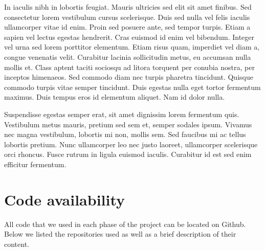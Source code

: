 \documentclass[
  12pt,
  a4paper,
  oneside]{krantz}
\begin{document}
In iaculis nibh in lobortis feugiat. Mauris ultricies sed elit sit amet
finibus. Sed consectetur lorem vestibulum cursus scelerisque. Duis sed
nulla vel felis iaculis ullamcorper vitae id enim. Proin sed posuere
ante, sed tempor turpis. Etiam a sapien vel lectus egestas hendrerit.
Cras euismod id enim vel bibendum. Integer vel urna sed lorem porttitor
elementum. Etiam risus quam, imperdiet vel diam a, congue venenatis
velit. Curabitur lacinia sollicitudin metus, eu accumsan nulla mollis
et. Class aptent taciti sociosqu ad litora torquent per conubia nostra,
per inceptos himenaeos. Sed commodo diam nec turpis pharetra tincidunt.
Quisque commodo turpis vitae semper tincidunt. Duis egestas nulla eget
tortor fermentum maximus. Duis tempus eros id elementum aliquet. Nam id
dolor nulla.

Suspendisse egestas semper erat, sit amet dignissim lorem fermentum
quis. Vestibulum metus mauris, pretium sed sem et, semper sodales ipsum.
Vivamus nec magna vestibulum, lobortis mi non, mollis sem. Sed faucibus
mi ac tellus lobortis pretium. Nunc ullamcorper leo nec justo laoreet,
ullamcorper scelerisque orci rhoncus. Fusce rutrum in ligula euismod
iaculis. Curabitur id est sed enim efficitur fermentum.

\cleardoublepage

\hypertarget{appendix-appendix}{%
\appendix {}}


\hypertarget{code-availability}{%
\chapter{Code availability}\label{code-availability}}

All code that we used in each phase of the project can be located on
Github. Below we listed the repositories used as well as a brief
description of their content.
\end{document}
